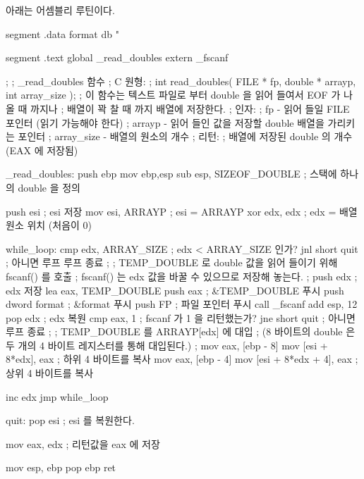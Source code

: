 아래는 어셈블리 루틴이다. 
\begin{AsmCodeListing}[label=read.asm]
segment .data
format  db      "%

segment .text
        global  _read_doubles
        extern  _fscanf


;
; _read_doubles 함수
; C 원형:
;   int read_doubles( FILE * fp, double * arrayp, int array_size );
; 이 함수는 텍스트 파일로 부터 double 을 읽어 들여서 EOF 가 나올 때 까지나 
; 배열이 꽉 찰 때 까지 배열에 저장한다.
; 인자:
;   fp         - 읽어 들일 FILE 포인터 (읽기 가능해야 한다)
;   arrayp     - 읽어 들인 값을 저장할 double 배열을 가리키는 포인터
;   array_size - 배열의 원소의 개수 
; 리턴:
;  배열에 저장된 double 의 개수 (EAX 에 저장됨)

_read_doubles:
        push    ebp
        mov     ebp,esp
        sub     esp, SIZEOF_DOUBLE      ; 스택에 하나의 double 을 정의 

        push    esi                     ; esi 저장
        mov     esi, ARRAYP             ; esi = ARRAYP
        xor     edx, edx                ; edx = 배열 원소 위치 (처음이 0)

while_loop:
        cmp     edx, ARRAY_SIZE         ; edx < ARRAY_SIZE 인가?
        jnl     short quit              ; 아니면 루프 루프 종료 
;
; TEMP_DOUBLE 로 double 값을 읽어 들이기 위해 fscanf() 를 호출
; fscanf() 는 edx 값을 바꿀 수 있으므로 저장해 놓는다. 
;
        push    edx                     ; edx 저장
        lea     eax, TEMP_DOUBLE
        push    eax                     ; &TEMP_DOUBLE 푸시
        push    dword format            ; &format 푸시
        push    FP                      ; 파일 포인터 푸시 
        call    _fscanf
        add     esp, 12
        pop     edx                     ; edx 복원
        cmp     eax, 1                  ; fscanf 가 1 을 리턴했는가?
        jne     short quit              ; 아니면 루프 종료
;
; TEMP_DOUBLE 를 ARRAYP[edx] 에 대입
; (8 바이트의 double 은 두 개의 4 바이트 레지스터를 통해 대입된다.)
;
        mov     eax, [ebp - 8]
        mov     [esi + 8*edx], eax      ; 하위 4 바이트를 복사 
        mov     eax, [ebp - 4]
        mov     [esi + 8*edx + 4], eax  ; 상위 4 바이트를 복사 

        inc     edx
        jmp     while_loop

quit:
        pop     esi                     ; esi 를 복원한다. 

        mov     eax, edx                ; 리턴값을 eax 에 저장 

        mov     esp, ebp
        pop     ebp
        ret 
\end{AsmCodeListing}

